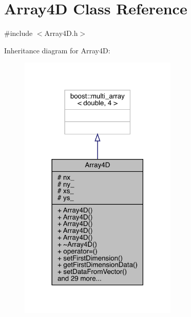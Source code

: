 \hypertarget{class_array4_d}{}\section{Array4D Class Reference}
\label{class_array4_d}


{\ttfamily \#include $<$Array4\+D.\+h$>$}



Inheritance diagram for Array4D\+:\nopagebreak
\begin{figure}[H]
\begin{center}
\leavevmode
\includegraphics[width=213pt]{class_array4_d__inherit__graph}
\end{center}
\end{figure}


